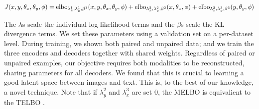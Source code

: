 \documentclass{article}
\begin{document}
\begin{equation}
    J(x, y, \theta_{x}, \theta_{y}, \phi) = \textup{elbo}_{\lambda_{x}^{1}, \lambda_{y}^{1}, \beta^{1}}(x, y, \theta_{x}, \theta_{y}, \phi) + \textup{elbo}_{\lambda_{x}^{2}, \lambda_{y}^{2}, \beta^{2}}(x, \theta_{x}, \phi) + \textup{elbo}_{\lambda_{x}^{3}, \lambda_{y}^{3}, \beta^{3}}(y, \theta_{y}, \phi)
\end{equation}

The $\lambda$s scale the individual log likelihood terms and the $\beta$s scale the KL divergence terms. We set these parameters using a validation set on a per-dataset level. During training, we shown both paired and unpaired data; and we train the three encoders and decoders together with shared weights. Regardless of paired or unpaired examples, our objective requires both modalities to be reconstructed, sharing parameters for all decoders. We found that this is crucial to learning a good latent space between images and text. This is, to the best of our knowledge, a novel technique. Note that if $\lambda_{y}^{2}$ and $\lambda_{x}^{3}$ are set 0, the MELBO is equivalient to the TELBO \cite{hinton2006training}.
\end{document}
